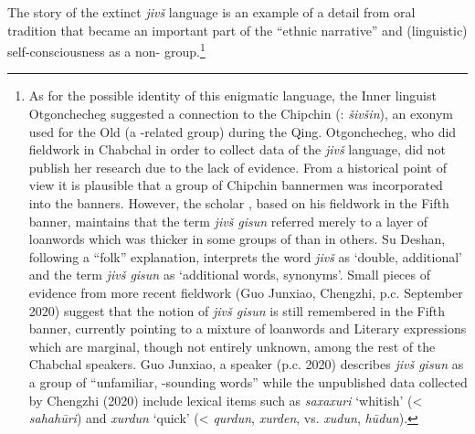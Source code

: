 \documentclass[output=paper,colorlinks,citecolor=brown]{langscibook}
\begin{document}
The story of the extinct \textit{jivš} language is an example of a detail from  oral tradition that became an important part of the  “ethnic narrative” and (linguistic) self-consciousness as a non- group.{\footnote{As for the possible identity of this enigmatic language, the Inner  linguist Otgonchecheg suggested a connection to the Chipchin (: \textit{šivšin}), an exonym used for the Old  (a -related  group) during the Qing. Otgonchecheg, who did fieldwork in Chabchal in order to collect data of the \textit{jivš} language, did not publish her research due to the lack of evidence. From a historical point of view it is plausible that a group of Chipchin  bannermen was incorporated into the  banners. However, the  scholar \citet{Su1984}, based on his fieldwork in the Fifth banner, maintains that the term \textit{jivš gisun} referred merely to a layer of  loanwords which was thicker in some groups of  than in others. Su Deshan, following a “folk” explanation, interprets the word \textit{jivš} as ‘double, additional’ and the term \textit{jivš gisun} as ‘additional words, synonyms’. Small pieces of evidence from more recent fieldwork (Guo Junxiao, Chengzhi, p.c. September 2020) suggest that the notion of \textit{jivš gisun} is still remembered in the Fifth banner, currently pointing to a mixture of  loanwords and Literary  expressions which are marginal, though not entirely unknown, among the rest of the Chabchal speakers. Guo Junxiao, a  speaker (p.c. 2020) describes \textit{jivš gisun} as a group of “unfamiliar, -sounding words” while the unpublished data collected by Chengzhi (2020) include lexical items such as \textit{saxaxuri} ‘whitish’ (<  \textit{sahahūri}) and \textit{xurdun} ‘quick’ (<  \textit{qurdun},  \textit{xurden}, vs.  \textit{xudun},  \textit{hūdun}).}}
\end{document}
